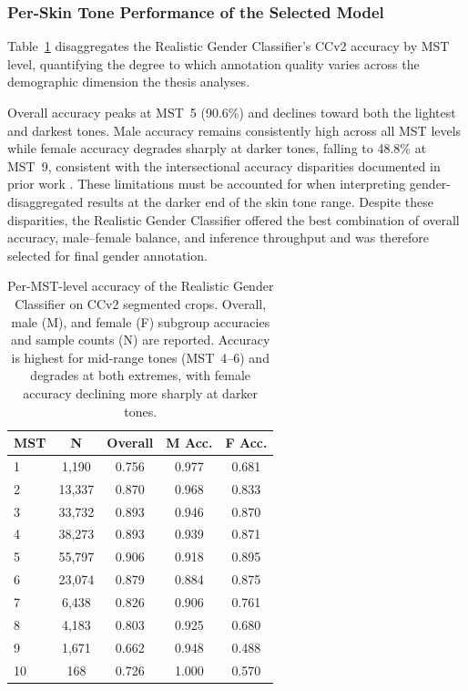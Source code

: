\subsubsection{Per-Skin Tone Performance of the Selected Model}
\label{subsubsec:gender_skintone}

Table~\ref{tab:gender_skintone} disaggregates the Realistic Gender Classifier's CCv2 accuracy by MST level, quantifying the degree to which annotation quality varies across the demographic dimension the thesis analyses.

Overall accuracy peaks at MST~5 (90.6\%) and declines toward both the lightest and darkest tones. Male accuracy remains consistently high across all MST levels while female accuracy degrades sharply at darker tones, falling to 48.8\% at MST~9, consistent with the intersectional accuracy disparities documented in prior work \cite{Buolamwini_2018_GenderShades}. These limitations must be accounted for when interpreting gender-disaggregated results at the darker end of the skin tone range. Despite these disparities, the Realistic Gender Classifier offered the best combination of overall accuracy, male--female balance, and inference throughput and was therefore selected for final gender annotation.

\begin{table}[H]
	\centering
	\footnotesize
	\begin{tabular}{lcccc}
		\toprule
		\textbf{MST} & \textbf{N} & \textbf{Overall} & \textbf{M Acc.} & \textbf{F Acc.} \\
		\midrule
		1            & 1{,}190    & 0.756            & 0.977           & 0.681           \\
		2            & 13{,}337   & 0.870            & 0.968           & 0.833           \\
		3            & 33{,}732   & 0.893            & 0.946           & 0.870           \\
		4            & 38{,}273   & 0.893            & 0.939           & 0.871           \\
		5            & 55{,}797   & 0.906            & 0.918           & 0.895           \\
		6            & 23{,}074   & 0.879            & 0.884           & 0.875           \\
		7            & 6{,}438    & 0.826            & 0.906           & 0.761           \\
		8            & 4{,}183    & 0.803            & 0.925           & 0.680           \\
		9            & 1{,}671    & 0.662            & 0.948           & 0.488           \\
		10           & 168        & 0.726            & 1.000           & 0.570           \\
		\bottomrule
	\end{tabular}
	\caption{Per-MST-level accuracy of the Realistic Gender Classifier on CCv2 segmented crops. Overall, male (M), and female (F) subgroup accuracies and sample counts (N) are reported. Accuracy is highest for mid-range tones (MST~4--6) and degrades at both extremes, with female accuracy declining more sharply at darker tones.}
	\label{tab:gender_skintone}
\end{table}

